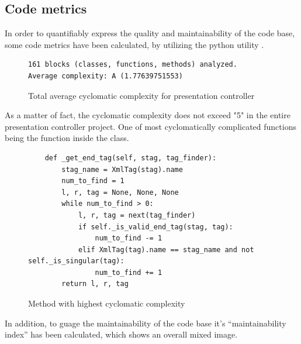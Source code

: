 \documentclass[12pt, fleqn, a4paper]{article}
\begin{document}
\subsection{Code metrics}
In order to quantifiably express the quality and maintainability of the code base, some code metrics have been calculated, by utilizing the python utility .
\begin{figure}[H]
	\centering
	\begin{verbatim} 
161 blocks (classes, functions, methods) analyzed.
Average complexity: A (1.77639751553)
	\end{verbatim}
	\caption{Total average cyclomatic complexity for presentation controller}
\end{figure}
As a matter of fact, the cyclomatic complexity does not exceed "5" in the entire presentation controller project. One of most cyclomatically complicated functions being the  function inside the  class.
\begin{figure}[H]
	\begin{verbatim} 
    def _get_end_tag(self, stag, tag_finder):
        stag_name = XmlTag(stag).name
        num_to_find = 1
        l, r, tag = None, None, None
        while num_to_find > 0:
            l, r, tag = next(tag_finder)
            if self._is_valid_end_tag(stag, tag):
                num_to_find -= 1
            elif XmlTag(tag).name == stag_name and not self._is_singular(tag):
                num_to_find += 1
        return l, r, tag
	\end{verbatim}
	\caption{Method with highest cyclomatic complexity}
\end{figure}
In addition, to guage the maintainability of the code base it's \enquote{maintainability index} has been calculated, which shows an overall mixed image.
\end{document}
